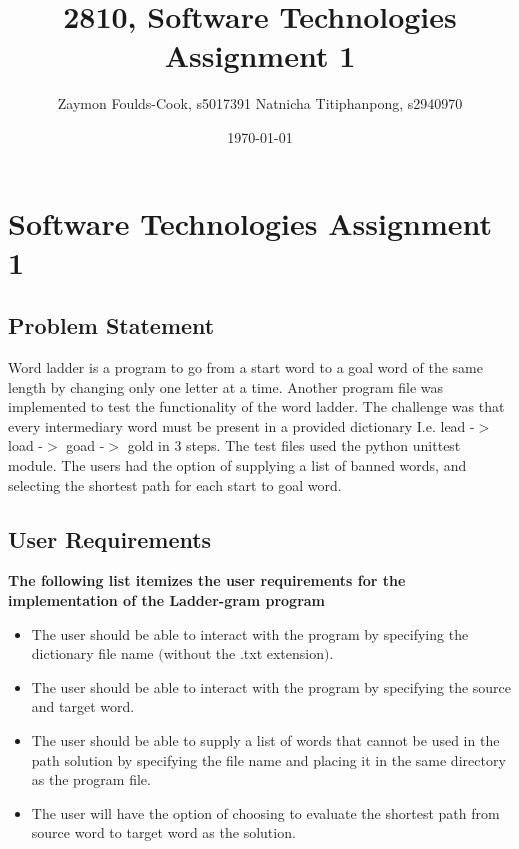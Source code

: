 \documentclass[12pt, a4]{report}
\title{2810, Software Technologies Assignment 1}
\author{Zaymon Foulds-Cook, s5017391 \textbar{} Natnicha Titiphanpong, s2940970}%
\date{\today}
\begin{document}
\begin{titlepage}
	\maketitle
\end{titlepage}
 \tableofcontents
\pagebreak
\section{Software Technologies Assignment 1}
\subsection{Problem Statement}
	\par Word ladder is a program to go from a start word to a goal word of the same length by changing only one
	letter at a time. Another program file was implemented to test the functionality of the word ladder. The challenge was that every intermediary word must be present in a provided dictionary I.e. lead -$>$ load -$>$ goad -$>$ gold in 3 steps. The test files used the python unittest module. The users had the option of supplying a list of banned words, and selecting the shortest path for each start to goal word. 
	
\subsection{User Requirements}
	\textbf{The following list itemizes the user requirements for the implementation of the Ladder-gram program}
	\begin{itemize}
		\item The user should be able to interact with the program by specifying the dictionary file name $($without the .txt extension$)$.
		\item The user should be able to interact with the program by specifying the source and target word.
		\item The user should be able to supply a list of words that cannot be used in the path solution by specifying the file name and placing it in the same directory as the program file.
		\item The user will have the option of choosing to evaluate the shortest path from source word to target word as the solution.
	\end{itemize}
	
\end{document}
